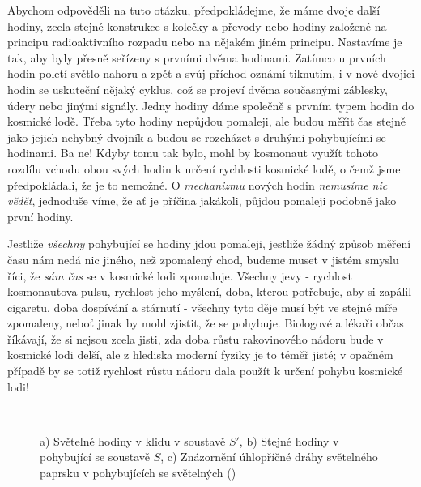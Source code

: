     Abychom odpověděli na tuto otázku, předpokládejme, že máme dvoje další hodiny, zcela stejné 
    konstrukce s kolečky a převody nebo hodiny založené na principu radioaktivního rozpadu nebo na 
    nějakém jiném principu. Nastavíme je tak, aby byly přesně seřízeny s prvními dvěma hodinami. 
    Zatímco u prvních hodin poletí světlo nahoru a zpět a svůj příchod oznámí tiknutím, i v nové 
    dvojici hodin se uskuteční nějaký cyklus, což se projeví dvěma současnými záblesky, údery nebo 
    jinými signály. Jedny hodiny dáme společně s prvním typem hodin do kosmické lodě. Třeba tyto 
    hodiny nepůjdou pomaleji, ale budou měřit čas stejně jako jejich nehybný dvojník a budou se 
    rozcházet s druhými pohybujícími se hodinami. Ba ne! Kdyby tomu tak bylo, mohl by kosmonaut 
    využít tohoto rozdílu vchodu obou svých hodin k určení rychlosti kosmické lodě, o čemž jsme 
    předpokládali, že je to nemožné. O \emph{mechanizmu} nových hodin \emph{nemusíme nic vědět}, 
    jednoduše víme, že ať je příčina jakákoli, půjdou pomaleji podobně jako první hodiny.
    
    Jestliže \emph{všechny} pohybující se hodiny jdou pomaleji, jestliže žádný způsob měření času 
    nám nedá nic jiného, než zpomalený chod, budeme muset v jistém smyslu říci, že \emph{sám čas} 
    se v kosmické lodi zpomaluje. Všechny jevy - rychlost kosmonautova pulsu, rychlost jeho 
    myšlení, doba, kterou potřebuje, aby si zapálil cigaretu, doba dospívání a stárnutí - všechny 
    tyto děje musí být ve stejné míře zpomaleny, neboť jinak by mohl zjistit, že se pohybuje. 
    Biologové a lékaři občas říkávají, že si nejsou zcela jisti, zda doba růstu rakovinového nádoru 
    bude v kosmické lodi delší, ale z hlediska moderní fyziky je to téměř jisté; v opačném případě 
    by se totiž rychlost růstu nádoru dala použít k určení pohybu kosmické lodi!
    
    \begin{figure}[ht!]  %
      \centering
           \hspace{1em}
           \\
      \caption{a) Světelné hodiny v klidu v soustavě \(S'\), b) Stejné hodiny v pohybující se 
               soustavě \(S\), c) Znázornění úhlopříčné dráhy světelného paprsku v pohybujících se
               světelných  (\cite[s.~217]{Feynman01})}
      \label{fyz:fig0003}
    \end{figure}
    
